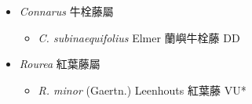 
  \begin{itemize}
 \item[] \textit{Connarus} 牛栓藤屬
                                
  \begin{itemize}
        \item[] \textit{C. subinaequifolius} Elmer  蘭嶼牛栓藤   DD
  \end{itemize}
 \item[] \textit{Rourea} 紅葉藤屬
                                
  \begin{itemize}
        \item[] \textit{R. minor} (Gaertn.) Leenhouts  紅葉藤   VU*
  \end{itemize}
  \end{itemize}

